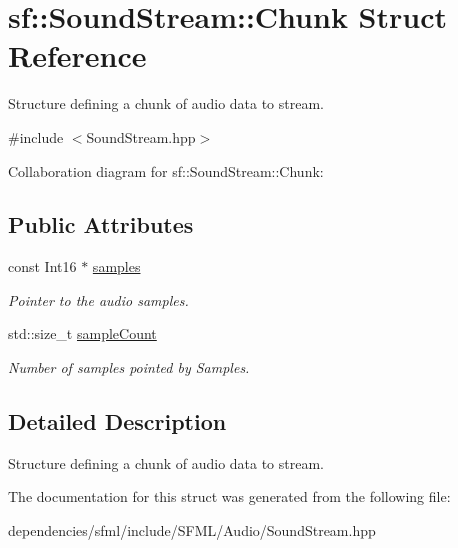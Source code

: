 \hypertarget{structsf_1_1_sound_stream_1_1_chunk}{}\section{sf\+:\+:Sound\+Stream\+:\+:Chunk Struct Reference}
\label{structsf_1_1_sound_stream_1_1_chunk}


Structure defining a chunk of audio data to stream.  




{\ttfamily \#include $<$Sound\+Stream.\+hpp$>$}



Collaboration diagram for sf\+:\+:Sound\+Stream\+:\+:Chunk\+:
\subsection*{Public Attributes}
\begin{DoxyCompactItemize}
\item 
\mbox{\label{structsf_1_1_sound_stream_1_1_chunk_aa3b84d69adbe663a17a7671626076df4}} 
const Int16 $\ast$ \hyperlink{structsf_1_1_sound_stream_1_1_chunk_aa3b84d69adbe663a17a7671626076df4}{samples}
\begin{DoxyCompactList}\small\item\em Pointer to the audio samples. \end{DoxyCompactList}\item 
\mbox{\label{structsf_1_1_sound_stream_1_1_chunk_af47f5d94012acf8b11f056ba77aff97a}} 
std\+::size\+\_\+t \hyperlink{structsf_1_1_sound_stream_1_1_chunk_af47f5d94012acf8b11f056ba77aff97a}{sample\+Count}
\begin{DoxyCompactList}\small\item\em Number of samples pointed by Samples. \end{DoxyCompactList}\end{DoxyCompactItemize}


\subsection{Detailed Description}
Structure defining a chunk of audio data to stream. 

The documentation for this struct was generated from the following file\+:\begin{DoxyCompactItemize}
\item 
dependencies/sfml/include/\+S\+F\+M\+L/\+Audio/Sound\+Stream.\+hpp\end{DoxyCompactItemize}
